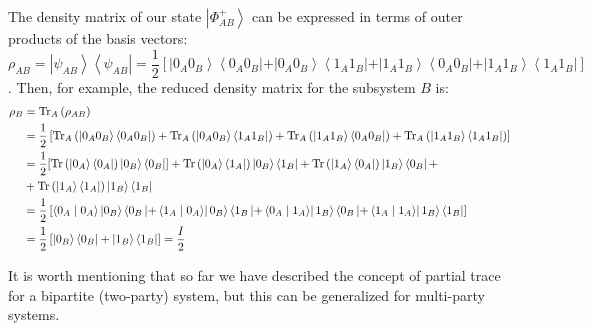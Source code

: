 The density matrix of our state $\left|\Phi^{+}_{A B}\right\rangle$ can be expressed in terms of outer products of the basis vectors:
$$
\rho_{A B}=\left|\psi_{A B}\right\rangle\left\langle\psi_{A B}\right|=\frac{1}{2}\left[\left|0_{A} 0_{B}\right\rangle\left\langle 0_{A} 0_{B}|+| 0_{A} 0_{B}\right\rangle\left\langle 1_{A} 1_{B}|+| 1_{A} 1_{B}\right\rangle\left\langle 0_{A} 0_{B}|+| 1_{A} 1_{B}\right\rangle\left\langle 1_{A} 1_{B}\right|\right]
$$.
Then, for example, the reduced density matrix for the subsystem $B$ is:
\begin{align*}
\rho_{B} &=\operatorname{Tr}_{A}\left(\rho_{A B}\right) \\
&=\frac{1}{2}\left[\operatorname{Tr}_{A}\left(\left|0_{A} 0_{B}\right\rangle\left\langle 0_{A} 0_{B}\right|\right)+\operatorname{Tr}_{A}\left(\left|0_{A} 0_{B}\right\rangle\left\langle 1_{A} 1_{B}\right|\right)+\operatorname{Tr}_{A}\left(\left|1_{A} 1_{B}\right\rangle\left\langle 0_{A} 0_{B}\right|\right)+\operatorname{Tr}_{A}\left(\left|1_{A} 1_{B}\right\rangle\left\langle 1_{A} 1_{B}\right|\right)\right] \\
&=\frac{1}{2}[\operatorname{Tr}\left(\ket{0_A}\bra{0_A}\right)\ket{0_B}\bra{0_B}] +
\operatorname{Tr}\left(\ket{0_A}\bra{1_A}\right)\ket{0_B}\bra{1_B} + 
\operatorname{Tr}\left(\ket{1_A}\bra{0_A}\right)\ket{1_B}\bra{0_B}+ \\
&+ \operatorname{Tr}\left(\ket{1_A}\bra{1_A}\right)\ket{1_B}\bra{1_B}
\\
 &=\frac{1}{2}\left[\left\langle 0_{A} \mid 0_{A}\right\rangle\left|0_{B}\right\rangle\left\langle 0_{B}\left|+\left\langle 1_{A} \mid 0_{A}\right\rangle\right| 0_{B}\right\rangle\left\langle 1_{B}\left|+\left\langle 0_{A} \mid 1_{A}\right\rangle\right| 1_{B}\right\rangle\left\langle 0_{B}\left|+\left\langle 1_{A} \mid 1_{A}\right\rangle\right| 1_{B}\right\rangle\left\langle 1_{B}\right|\right] \\
 &=\frac{1}{2}\left[\left|0_{B}\right\rangle\left\langle 0_{B}|+| 1_{B}\right\rangle\left\langle 1_{B}\right|\right] =\frac{I}{2}
\end{align*}

It is worth mentioning that so far we have described the concept of partial trace for a bipartite (two-party) system, but this can be generalized for multi-party systems.




